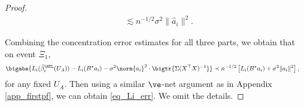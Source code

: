 \documentclass[aos,preprint]{imsart}
\begin{document}
\begin{proof}
\begin{align*}
		&\lesssim   n^{-1/2} \sigma^2 \|\hat a_i\|^2.
	\end{align*}

	 
	Combining the concentration error estimates for all three parts, we obtain that on event $\Xi_1$,
	\begin{align*}
			&\bigabs{L_i(\hat{\beta}_i^{\MTL}(U_A)) - L_i(B^{\star} {a}_i) - \sigma^2 \norm{{a}_i}^2 \cdot \bigtr{\Sigma (X^{\top}X)^{-1}}}  \prec  n^{-1/2} \left[L_i(B^{\star} {a}_i) + \sigma^2 \| a_i\|^2\right] ,
		\end{align*}
	for any fixed $U_A$. Then using a similar $\ve$-net argument as in Appendix \ref{app_firstpf}, we can obtain  \eqref{eq_Li_err}. We omit the details.
\end{proof}
\end{document}
